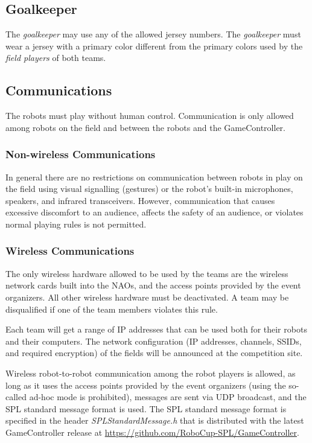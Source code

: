 \subsection{Goalkeeper}
\label{sec:goalkeeper}

The \emph{goalkeeper} may use any of the allowed jersey numbers. The \emph{goalkeeper} must wear a jersey with a primary color different from the primary colors used by the \emph{field players} of both teams.

\subsection{Communications}

The robots must play without human control. Communication is only allowed among robots on the field and between the robots and the GameController.

\subsubsection{Non-wireless Communications}
\label{sec:acoustic}
In general there are no restrictions on communication between robots in play on the field using visual signalling (\eg gestures) or the robot's built-in microphones, speakers, and infrared transceivers. However, communication that causes excessive discomfort to an audience, affects the safety of an audience, or violates normal playing rules is not permitted.

\subsubsection{Wireless Communications}
\label{sec:wireless}
The only wireless hardware allowed to be used by the teams are the wireless network cards built into the NAOs, and the access points provided by the event organizers. All other wireless hardware must be deactivated. A team may be disqualified if one of the team members violates this rule.

Each team will get a range of IP addresses that can be used both for their robots and their computers. The network configuration (\eg IP addresses, channels, SSIDs, and required encryption) of the fields will be announced at the competition site.

Wireless robot-to-robot communication among the robot players is allowed, as long as it uses the access points provided by the event organizers (using the so-called ad-hoc mode is prohibited), messages are sent via UDP broadcast, and the SPL standard message format is used. The SPL standard message format is specified in the header \emph{SPLStandardMessage.h} that is distributed with the latest GameController release at \url{https://github.com/RoboCup-SPL/GameController}.

